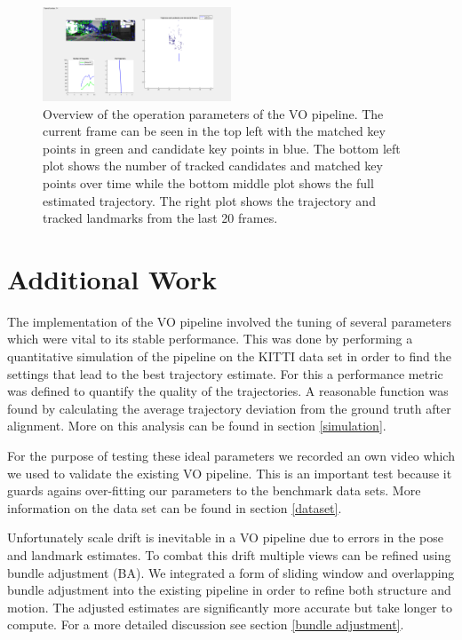 \begin{figure}[H]
  \centering
    \includegraphics[width=0.5\textwidth]{figures/overview}
  \caption{Overview of the operation parameters of the VO pipeline. 
  The current frame can be seen in the top left with the matched key points in green and candidate key points in blue. 
  The bottom left plot shows the number of tracked candidates and matched key points over time while the bottom middle plot shows the full estimated trajectory. 
  The right plot shows the trajectory and tracked landmarks from the last 20 frames.}
  \label{fig:overview}
\end{figure}

\section{Additional Work}
\label{additionalWork}
The implementation of the VO pipeline involved the tuning of several parameters which were vital to its stable performance. 
This was done by performing a quantitative simulation of the pipeline on the KITTI data set in order to find the settings that lead to the best trajectory estimate. 
For this a performance metric was defined to quantify the quality of the trajectories. A reasonable function was found by calculating the average trajectory deviation from the ground truth after alignment. 
More on this analysis can be found in section \ref{simulation}. \par
For the purpose of testing these ideal parameters we recorded an own video which we used to validate the existing VO pipeline. 
This is an important test because it guards agains over-fitting our parameters to the benchmark data sets. 
More information on the data set can be found in section \ref{dataset}. \par
Unfortunately scale drift is inevitable in a VO pipeline due to errors in the pose and landmark estimates. 
To combat this drift multiple views can be refined using bundle adjustment (BA). 
We integrated a form of sliding window and overlapping bundle adjustment into the existing pipeline in order to refine both structure and motion. 
The adjusted estimates are significantly more accurate but take longer to compute. 
For a more detailed discussion see section \ref{bundle adjustment}.